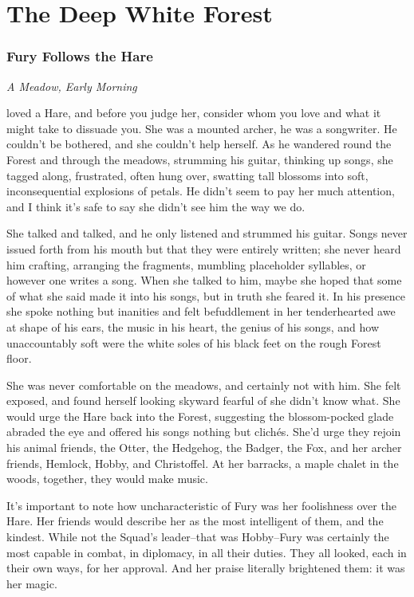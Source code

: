 \documentclass[11pt,a5paper]{article}
\newcommand{\alet}[1]{\textit{#1}\vspace{1em}}
\begin{document}
\part{The Deep White Forest}

\newpage

\section{Fury Follows the Hare}

\alet{A Meadow, Early Morning}

 loved a Hare, and before you judge her, consider whom you love and what it might take to dissuade you. She was a mounted archer, he was a songwriter. He couldn't be bothered, and she couldn't help herself. As he wandered round the Forest and through the meadows, strumming his guitar, thinking up songs, she tagged along, frustrated, often hung over, swatting tall blossoms into soft, inconsequential explosions of petals. He didn't seem to pay her much attention, and I think it's safe to say she didn't see him the way we do.

She talked and talked, and he only listened and strummed his guitar. Songs never issued forth from his mouth but that they were entirely written; she never heard him crafting, arranging the fragments, mumbling placeholder syllables, or however one writes a song. When she talked to him, maybe she hoped that some of what she said made it into his songs, but in truth she feared it. In his presence she spoke nothing but inanities and felt befuddlement in her tenderhearted awe at shape of his ears, the music in his heart, the genius of his songs, and how unaccountably soft were the white soles of his black feet on the rough Forest floor.

She was never comfortable on the meadows, and certainly not with him. She felt exposed, and found herself looking skyward fearful of she didn't know what. She would urge the Hare back into the Forest, suggesting the blossom-pocked glade abraded the eye and offered his songs nothing but clichés. She'd urge they rejoin his animal friends, the Otter, the Hedgehog, the Badger, the Fox, and her archer friends, Hemlock, Hobby, and Christoffel. At her barracks, a maple chalet in the woods, together, they would make music.

It's important to note how uncharacteristic of Fury was her foolishness over the Hare. Her friends would describe her as the most intelligent of them, and the kindest. While not the Squad's leader--that  was Hobby--Fury was certainly the most capable in combat, in diplomacy, in all their duties. They all looked, each in their own ways, for her approval. And her praise literally brightened them: it was her magic.
\end{document}
